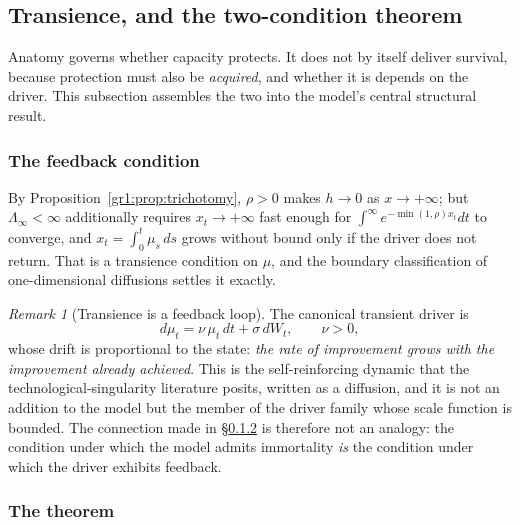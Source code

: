 \documentclass[11pt]{article}
\numberwithin{equation}{section}
\theoremstyle{plain}
\theoremstyle{definition}
\theoremstyle{remark}
\newtheorem{remark}[theorem]{Remark}
\begin{document}
\subsection{Transience, and the two-condition theorem}
\label{gr1:sub:twocond}

Anatomy governs whether capacity protects. It does not by itself deliver
survival, because protection must also be \emph{acquired}, and whether
it is depends on the driver. This subsection assembles the two into the
model's central structural result.

\subsubsection{The feedback condition}\label{gr1:subsub:feedback}

By Proposition~\ref{gr1:prop:trichotomy}, $\rho>0$ makes $h\to0$ as
$x\to+\infty$; but $\Lambda_\infty<\infty$ additionally requires
$x_t\to+\infty$ fast enough for $\int^\infty e^{-\min(1,\rho)x_t}dt$ to
converge, and $x_t=\int_0^t\mu_s\,ds$ grows without bound only if the
driver does not return. That is a transience condition on $\mu$, and
the boundary classification of one-dimensional diffusions settles it
exactly.

\begin{remark}[Transience is a feedback loop]\label{gr1:rem:feedback}
The canonical transient driver is
\begin{equation}\label{gr1:eq:uou}
d\mu_t=\nu\,\mu_t\,dt+\sigma\,dW_t,\qquad \nu>0,
\end{equation}
whose drift is proportional to the state: \emph{the rate of improvement
grows with the improvement already achieved}. This is the
self-reinforcing dynamic that the technological-singularity literature
posits, written as a diffusion, and it is not an addition to the model
but the member of the driver family whose scale function is bounded.
The connection made in \S\ref{gr1:subsub:twocondthm} is therefore not an
analogy: the condition under which the model admits immortality
\emph{is} the condition under which the driver exhibits feedback.
\end{remark}

\subsubsection{The theorem}\label{gr1:subsub:twocondthm}
\end{document}
